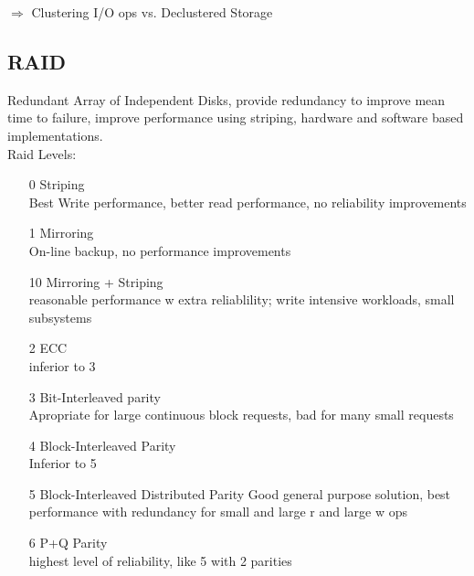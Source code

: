         $\Rightarrow$ Clustering I/O ops vs. Declustered Storage

    \subsection{RAID}
    Redundant Array of Independent Disks, provide redundancy to improve mean time to failure, improve performance using striping, hardware and software based implementations. \\
    Raid Levels: 
    \begin{enumerate}
        \item[0] Striping \\
        Best Write performance, better read performance, no reliability improvements
        \item[1] Mirroring \\
        On-line backup, no performance improvements
        \item[10] Mirroring + Striping \\
        reasonable performance w extra reliablility; write intensive workloads, small subsystems
        \item[2] ECC \\
        inferior to 3
        \item[3] Bit-Interleaved parity \\
        Apropriate for large continuous block requests, bad for many small requests
        \item[4] Block-Interleaved Parity \\
        Inferior to 5
        \item[5] Block-Interleaved Distributed Parity
        Good general purpose solution, best performance with redundancy for small and large r and large w ops
        \item[6] P+Q Parity \\
        highest level of reliability, like 5 with 2 parities
    \end{enumerate}
